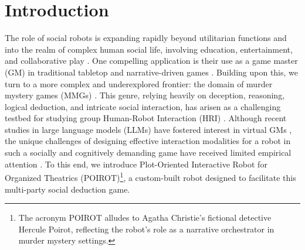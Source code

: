 \documentclass[sigconf,screen]{acmart-tagged}
\newcommand{\rev}[1]{#1}
\begin{document}
\section{Introduction}
The role of social robots is \rev{expanding} rapidly beyond utilitarian functions and into the realm of complex human social life, involving education, entertainment, and collaborative play \cite{belpaeme2018social, munoz2021robo, rato2023robots}. One compelling application is their use as a game master (GM) in traditional tabletop and narrative-driven games \cite{fischbach2018follow, kennington2014probabilistic}. Building upon this, we turn to a more complex and underexplored frontier: the domain of murder mystery games (MMGs) \cite{zhu2024player, wu2023deciphering}. This genre, relying heavily on deception, reasoning, logical deduction, and intricate social interaction, has arisen as a challenging testbed for studying group Human-Robot Interaction (HRI) \cite{moujahid2022multi, parreira2022design, tennent2019micbot, oliveira2021human}. Although recent studies in large language models (LLMs) have fostered interest in virtual GMs \cite{sasha2025multi, song2024you}, the unique challenges of designing effective interaction modalities for a robot in such a socially and cognitively demanding game have received limited empirical attention \cite{munoz2021robo, rato2023robots, lin2022benefits, ng2024role}. To this end, we introduce Plot-Oriented Interactive Robot for Organized Theatrics (POIROT)\footnote{The acronym POIROT alludes to Agatha Christie's fictional detective Hercule Poirot, reflecting the robot's role as a narrative orchestrator in murder mystery settings.}, a custom-built robot designed to facilitate this multi-party social deduction game.
\end{document}
